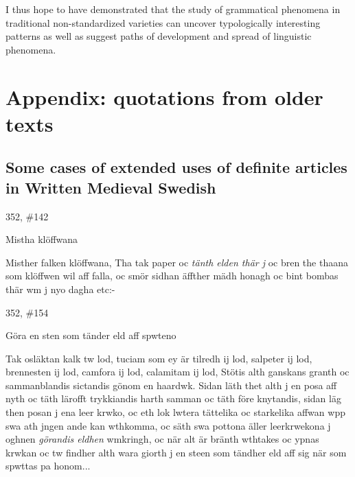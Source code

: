 \begin{styleBodytextC}
I thus hope to have demonstrated that the study of grammatical phenomena in traditional non-standardized varieties can uncover typologically interesting patterns as well as suggest paths of development and spread of linguistic phenomena. 

\end{styleBodytextC}

\chapter[Appendix: quotations from older texts]{Appendix: quotations from older texts}
\section{Some cases of extended uses of definite articles in Written Medieval Swedish}

\begin{styleBlockQuote}
352, \#142

\end{styleBlockQuote}

\begin{styleBlockQuote}
Mistha klöffwana

\end{styleBlockQuote}

\begin{styleBodyTextFirst}
Misther falken klöffwana, Tha tak paper oc \textit{tänth elden thär j} oc bren the thaana som klöffwen wil aff falla, oc smör sidhan äffther mädh honagh oc bint bombas thär wm j nyo dagha etc:-

\end{styleBodyTextFirst}

\begin{styleBlockQuote}
352, \#154

\end{styleBlockQuote}

\begin{styleBlockQuoteHeading}
Göra en sten som tänder eld aff spwteno 

\end{styleBlockQuoteHeading}

\begin{styleBodyTextFirst}
Tak osläktan kalk tw lod, tuciam som ey är tilredh ij lod, salpeter ij lod, brennesten ij lod, camfora ij lod, calamitam ij lod, Stötis alth ganskans granth oc sammanblandis sictandis gönom en haardwk. Sidan läth thet alth j en posa aff nyth oc täth lärofft trykkiandis harth samman oc täth före knytandis, sidan läg then posan j ena leer krwko, oc eth lok lwtera tättelika oc starkelika affwan wpp swa ath jngen ande kan wthkomma, oc säth swa pottona äller leerkrwekona j oghnen \textit{görandis eldhen} wmkringh, oc när alt är bränth wthtakes oc ypnas krwkan oc tw findher alth wara giorth j en steen som tändher eld aff sig när som spwttas pa honom...

\end{styleBodyTextFirst}

